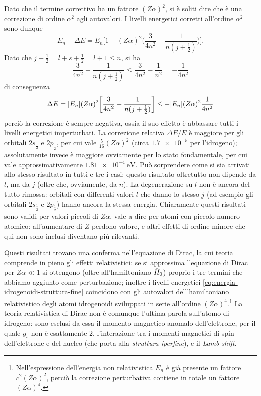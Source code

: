 Dato che il termine correttivo ha un fattore $(Z\alpha)^2$, si è soliti dire che è una correzione di ordine $\alpha^2$ agli autovalori.
I livelli energetici corretti all'ordine $\alpha^2$ sono dunque
\begin{equation}
    E_n+\Delta E=
    E_n\biggl[1-(Z\alpha)^2\biggl(\frac3{4n^2}-\frac1{n(j+\frac12)}\biggr)\biggr].
    \label{eq:energia-idrogenoidi-struttura-fine}
\end{equation}
Dato che $j+\frac12=l+s+\frac12=l+1\le n$, si ha
\begin{equation}
    \frac3{4n^2}-\frac1{n(j+\frac12)}\le
    \frac3{4n^2}-\frac1{n^2}=
    -\frac1{4n^2}
\end{equation}
di conseguenza
\begin{equation}
    \Delta E=
    \lvert E_n\rvert(Z\alpha)^2\biggl[\frac3{4n^2}-\frac1{n(j+\frac12)}\biggr]\le
    -\lvert E_n\rvert(Z\alpha)^2\frac1{4n^2}
\end{equation}
perciò la correzione è sempre negativa, ossia il suo effetto è abbassare tutti i livelli energetici imperturbati.
La correzione relativa $\Delta E/E$ è maggiore per gli orbitali $2s_{\frac12}$ e $2p_{\frac12}$, per cui vale $\frac5{16}(Z\alpha)^2$ (circa $\num{1.7e-5}$ per l'idrogeno); assolutamente invece è maggiore ovviamente per lo stato fondamentale, per cui vale approssimativamente $\SI{1.81e-4}{\electronvolt}$.
Può sorprendere come si sia arrivati allo stesso risultato in tutti e tre i casi: questo risultato oltretutto non dipende da $l$, ma da $j$ (oltre che, ovviamente, da $n$).
La degenerazione su $l$ non è ancora del tutto rimossa: orbitali con differenti valori $l$ che danno lo stesso $j$ (ad esempio gli orbitali $2s_{\frac12}$ e $2p_{\frac12}$) hanno ancora la stessa energia.
Chiaramente questi risultati sono validi per valori piccoli di $Z\alpha$, vale a dire per atomi con piccolo numero atomico: all'aumentare di $Z$ perdono valore, e altri effetti di ordine minore che qui non sono inclusi diventano più rilevanti.

Questi risultati trovano una conferma nell'equazione di Dirac, la cui teoria comprende in pieno gli effetti relativistici: se si approssima l'equazione di Dirac per $Z\alpha\ll 1$ si ottengono (oltre all'hamiltoniano $\hat{H}_0$) proprio i tre termini che abbiamo aggiunto come perturbazione; inoltre i livelli energetici \eqref{eq:energia-idrogenoidi-struttura-fine} coincidono con gli autovalori dell'hamiltoniano relativistico degli atomi idrogenoidi sviluppati in serie all'ordine $(Z\alpha)^4$.\footnote{
    Nell'espressione dell'energia non relativistica $E_n$ è già presente un fattore $c^2(Z\alpha)^2$, perciò la correzione perturbativa contiene in totale un fattore $(Z\alpha)^4$.
}
La teoria relativistica di Dirac non è comunque l'ultima parola sull'atomo di idrogeno: sono esclusi da essa il momento magnetico anomalo dell'elettrone, per il quale $g_s$ non è esattamente $2$, l'interazione tra i momenti magnetici di spin dell'elettrone e del nucleo (che porta alla \emph{struttura iperfine}), e il \emph{Lamb shift}.
